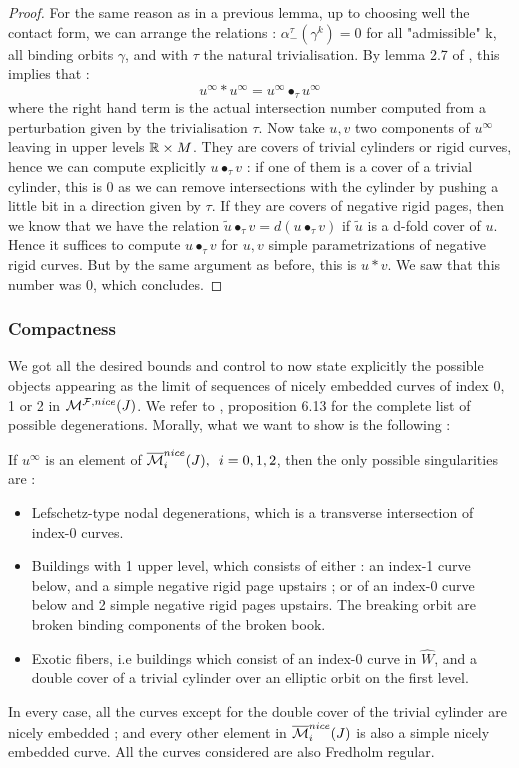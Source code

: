 \documentclass[../main.tex]{subfiles}
\begin{document}
\begin{proof}
For the same reason as in a previous lemma, up to choosing well the contact form, we can arrange the relations : $\alpha_-^\tau(\gamma^k) = 0$ for all "admissible" k, all binding orbits $\gamma$, and with $\tau$ the natural trivialisation. By lemma 2.7 of \cite{SOBD2}, this implies that : 
$$u^\infty* u^\infty = u^\infty\bullet_\tau u^\infty$$
where the right hand term is the actual intersection number computed from a perturbation given by the trivialisation $\tau$. Now take $u,v$ two components of $u^\infty$ leaving in upper levels $\mathbb{R}\times M$. They are covers of trivial cylinders or rigid curves, hence we can compute explicitly $u\bullet_\tau v $ : if one of them is a cover of a trivial cylinder, this is $0$ as we can remove intersections with the cylinder by pushing a little bit in a direction given by $\tau$. If they are covers of negative rigid pages, then we know that we have the relation $\tilde u\bullet_\tau v = d(u\bullet_{\tau}v)$ if $\tilde u$ is a d-fold cover of $u$. Hence it suffices to compute $u\bullet_\tau v$ for $u,v$ simple parametrizations of negative rigid curves. But by the same argument as before, this is $u* v$. We saw that this number was $0$, which concludes. 
\end{proof}


\subsubsection{Compactness}
We got all the desired bounds and control to now state explicitly the possible objects appearing as the limit of sequences of nicely embedded curves of index 0, 1 or 2 in $\mathcal{M}^{\mathcal{F},nice}(J)$. We refer to \cite{SOBD2}, proposition 6.13 for the complete list of possible degenerations. Morally, what we want to show is the following :
\begin{proposition}
If $u^\infty$ is an element of $\overline{\mathcal{M}}^{nice}_i(J),\,\,\, i = 0,1,2$, then the only possible singularities are : 
\begin{itemize}
    \item Lefschetz-type nodal degenerations, which is a transverse intersection of index-0 curves.
    \item Buildings with 1 upper level, which consists of either : an index-1 curve below, and a simple negative rigid page upstairs ;  or of an index-0 curve below and 2 simple negative rigid pages upstairs. The breaking orbit are broken binding components of the broken book.
    \item Exotic fibers, i.e buildings which consist of an index-0 curve in $\widehat{W}$, and a double cover of a trivial cylinder over an elliptic orbit on the first level.
\end{itemize}
In every case, all the curves except for the double cover of the trivial cylinder are nicely embedded ; and every other element in $\overline{\mathcal{M}}^{nice}_i(J)$ is also a simple nicely embedded curve. All the curves considered are also Fredholm regular.
\end{proposition}
\end{document}
